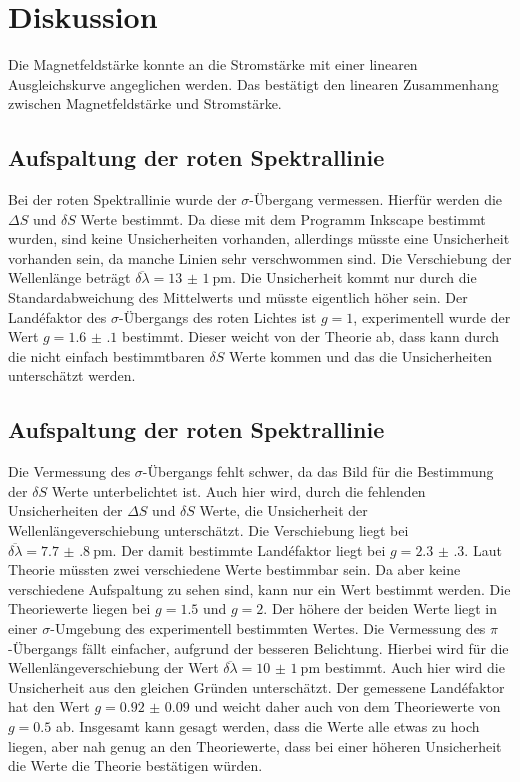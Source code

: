 \section{Diskussion}
Die Magnetfeldstärke konnte an die Stromstärke mit einer linearen Ausgleichskurve angeglichen werden. 
Das bestätigt den linearen Zusammenhang zwischen Magnetfeldstärke und Stromstärke.
\subsection{Aufspaltung der roten Spektrallinie}
Bei der roten Spektrallinie wurde der $\sigma$-Übergang vermessen. Hierfür werden die $\Delta S$ und $\delta S$ 
Werte bestimmt. Da diese mit dem Programm Inkscape \cite{inkscape} bestimmt wurden, sind keine Unsicherheiten vorhanden, allerdings 
müsste eine Unsicherheit vorhanden sein, da manche Linien sehr verschwommen sind. Die Verschiebung der Wellenlänge 
beträgt $\overline{\delta\lambda} = \SI{13(1)}{\pico\meter}$. Die Unsicherheit kommt nur durch die Standardabweichung des 
Mittelwerts und müsste eigentlich höher sein.
Der Landéfaktor des $\sigma$-Übergangs des roten Lichtes ist $g=1$, experimentell wurde der Wert $g=\num{1.6(1)}$ 
bestimmt. Dieser weicht von der Theorie ab, dass kann durch die nicht einfach bestimmtbaren $\delta S$ Werte kommen und 
das die Unsicherheiten unterschätzt werden.
\subsection{Aufspaltung der roten Spektrallinie}
Die Vermessung des $\sigma$-Übergangs fehlt schwer, da das Bild für die Bestimmung der $\delta S$ Werte unterbelichtet ist.
Auch hier wird, durch die fehlenden Unsicherheiten der $\Delta S$ und $\delta S$ Werte, die Unsicherheit der 
Wellenlängeverschiebung unterschätzt. Die Verschiebung liegt bei $\overline{\delta\lambda} = \SI{7.7(8)}{\pico\meter}$.
Der damit bestimmte Landéfaktor liegt bei $g=\num{2.3(3)}$. Laut Theorie müssten zwei verschiedene Werte bestimmbar sein.
Da aber keine verschiedene Aufspaltung zu sehen sind, kann nur ein Wert bestimmt werden. Die Theoriewerte liegen bei 
$g=\num{1.5}$ und $g=2$. Der höhere der beiden Werte liegt in einer $\sigma$-Umgebung des experimentell bestimmten Wertes.
Die Vermessung des $\pi$-Übergangs fällt einfacher, aufgrund der besseren Belichtung.
Hierbei wird für die Wellenlängeverschiebung der Wert $\overline{\delta\lambda} = \SI{10(1)}{\pico\meter}$ bestimmt. 
Auch hier wird die Unsicherheit aus den gleichen Gründen unterschätzt.
Der gemessene Landéfaktor hat den Wert $g=\num{0.92(9)}$ und weicht daher auch von dem Theoriewerte von $g=\num{0.5}$ ab.
Insgesamt kann gesagt werden, dass die Werte alle etwas zu hoch liegen, aber nah genug an den Theoriewerte, dass bei einer 
höheren Unsicherheit die Werte die Theorie bestätigen würden. 